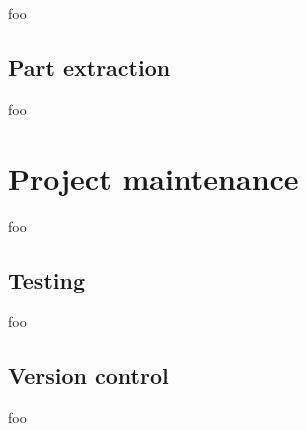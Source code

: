 foo

\subsection{Part extraction}

foo

\section{Project maintenance}

foo

\subsection{Testing}

foo

\subsection{Version control}

foo